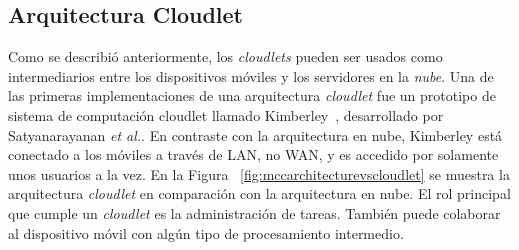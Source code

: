 \subsection{Arquitectura Cloudlet}

Como se describió anteriormente, los \textit{cloudlets} pueden ser usados como intermediarios entre los dispositivos móviles y los servidores 
en la \textit{nube}. Una de las primeras implementaciones de una arquitectura \textit{cloudlet} fue un prototipo de sistema de computación
cloudlet llamado Kimberley~\cite{5280678}, desarrollado por Satyanarayanan \textit{et al.}.  En contraste con la arquitectura en nube, 
Kimberley está conectado a los móviles a través de LAN, no WAN, y es accedido por solamente unos usuarios a la vez. En la Figura
~\ref{fig:mccarchitecturevscloudlet} se 
muestra la arquitectura \textit{cloudlet} en comparación con la arquitectura en nube. El rol principal que cumple un \textit{cloudlet} 
es la administración de tareas. También puede colaborar al dispositivo móvil con algún tipo de procesamiento intermedio.

